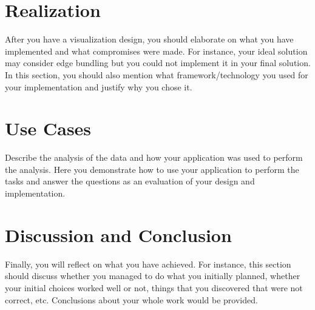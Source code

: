 \documentclass[journal]{vgtc}                %
\begin{document}
\section{Realization}

After you have a visualization design, you should elaborate on what you have implemented and what compromises were made. For instance, your ideal solution may consider edge bundling \cite{holten2006hierarchical} but you could not implement it in your final solution. In this section, you should also mention what framework/technology you used for your implementation and justify why you chose it.

\section{Use Cases}

Describe the analysis of the data and how your application was used to perform the analysis. Here you demonstrate how to use your application to perform the tasks and answer the questions as an evaluation of your design and implementation.


\section{Discussion and Conclusion}

Finally, you will reflect on what you have achieved. For instance, this section should discuss whether you managed to do what you initially planned, whether your initial choices worked well or not, things that you discovered that were not correct, etc. Conclusions about your whole work would be provided.



\end{document}
